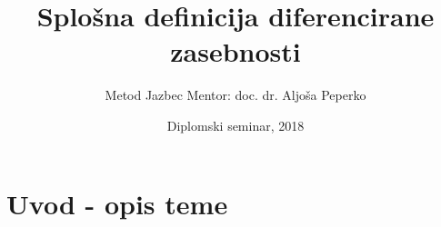 \documentclass{beamer}
\title[Diferencirana zasebnost] 
{Splošna definicija diferencirane zasebnosti}
\author[Metod Jazbec] 
{Metod Jazbec
\newline
\newline
Mentor: doc. dr. Aljoša Peperko}
\institute[FMF] 
{
  
  Fakulteta za matematiko in fiziko\\
  Univerza v Ljubljani
 }
\date[DS 2018] %
{Diplomski seminar, 2018}
\begin{document}

\begin{frame}
  \titlepage
\end{frame}






\section{Uvod - opis teme}
\end{document}
